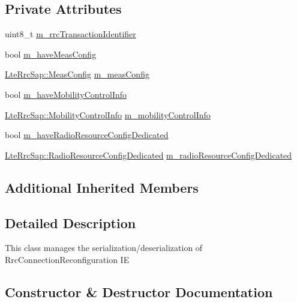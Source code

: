 \subsection*{Private Attributes}
\begin{DoxyCompactItemize}
\item 
uint8\+\_\+t \hyperlink{classns3_1_1RrcConnectionReconfigurationHeader_ae6f276694b1b97f017227127d196cd2a}{m\+\_\+rrc\+Transaction\+Identifier}
\item 
bool \hyperlink{classns3_1_1RrcConnectionReconfigurationHeader_a274b29c01be85788f4857565cf9e05c5}{m\+\_\+have\+Meas\+Config}
\item 
\hyperlink{structns3_1_1LteRrcSap_1_1MeasConfig}{Lte\+Rrc\+Sap\+::\+Meas\+Config} \hyperlink{classns3_1_1RrcConnectionReconfigurationHeader_a5fd4a46dd4c2fdefd5fdaa4d6f51a198}{m\+\_\+meas\+Config}
\item 
bool \hyperlink{classns3_1_1RrcConnectionReconfigurationHeader_a9028689c10df4671430dbc0179a971bd}{m\+\_\+have\+Mobility\+Control\+Info}
\item 
\hyperlink{structns3_1_1LteRrcSap_1_1MobilityControlInfo}{Lte\+Rrc\+Sap\+::\+Mobility\+Control\+Info} \hyperlink{classns3_1_1RrcConnectionReconfigurationHeader_a5fcc1f18f57bf3d669b61cfccc625531}{m\+\_\+mobility\+Control\+Info}
\item 
bool \hyperlink{classns3_1_1RrcConnectionReconfigurationHeader_ad160e4e3e27c9795c223fc97f3e69d41}{m\+\_\+have\+Radio\+Resource\+Config\+Dedicated}
\item 
\hyperlink{structns3_1_1LteRrcSap_1_1RadioResourceConfigDedicated}{Lte\+Rrc\+Sap\+::\+Radio\+Resource\+Config\+Dedicated} \hyperlink{classns3_1_1RrcConnectionReconfigurationHeader_a7010bf4b65c2e3aeb25f889bd16ea10f}{m\+\_\+radio\+Resource\+Config\+Dedicated}
\end{DoxyCompactItemize}
\subsection*{Additional Inherited Members}


\subsection{Detailed Description}
This class manages the serialization/deserialization of Rrc\+Connection\+Reconfiguration IE 

\subsection{Constructor \& Destructor Documentation}
